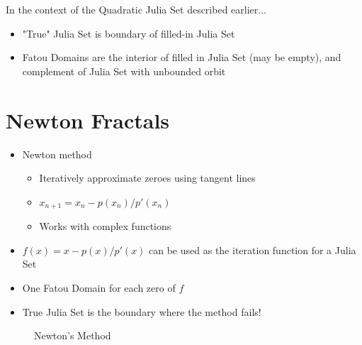 \documentclass{article}
\begin{document}
In the context of the Quadratic Julia Set described earlier...
\begin{itemize}
    \item "True" Julia Set is boundary of filled-in Julia Set
    \item Fatou Domains are the interior of filled in Julia Set (may be empty), and complement of Julia Set with unbounded orbit
\end{itemize}


\section{Newton Fractals}

\begin{itemize}
    \item Newton method
    \begin{itemize}
        \item Iteratively approximate zeroes using tangent lines
        \item $x_{n+1} = x_n - p(x_n)/p'(x_n)$
        \item Works with complex functions
    \end{itemize}
    \item $f(x) = x - p(x)/p'(x)$ can be used as the iteration function for a Julia Set
    \item One Fatou Domain for each zero of $f$
    \item True Julia Set is the boundary where the method fails!
\end{itemize}


\begin{figure}[!htbp]
    \centering
    \caption{Newton's Method} %
\end{figure}%


%
\end{document}

